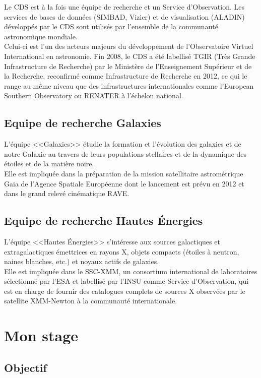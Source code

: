 \documentclass[a4paper,french,8pt]{article}
\begin{document}
		Le CDS est à la fois une équipe de recherche et un Service d’Observation.
		Les services de bases de données (SIMBAD, Vizier) et de visualisation (ALADIN) développés par le CDS
		sont utilisés par l’ensemble de la communauté astronomique mondiale. \\
		Celui-ci est l'un des acteurs majeurs du développement de l'Observatoire Virtuel International en astronomie.
		Fin 2008, le CDS a été labellisé TGIR (Très Grande Infrastructure de Recherche) par le Ministère de l'Enseignement Supérieur et de la Recherche, 
		reconfirmé comme Infrastructure de Recherche en 2012, ce qui le range au même niveau que des infrastructures internationales
		comme l’European Southern Observatory ou RENATER à l’échelon national.

	\subsection{Equipe de recherche Galaxies}
	
		L’équipe <<Galaxies>> étudie la formation et l’évolution des galaxies et de notre Galaxie 
		au travers de leurs populations stellaires et de la dynamique des étoiles et de la matière noire. \\
		Elle est impliquée dans la préparation de la mission satellitaire astrométrique Gaia de l’Agence Spatiale Européenne 
		dont le lancement est prévu en 2012 et dans le grand relevé cinématique RAVE. 
	
	\subsection{Equipe de recherche Hautes Énergies} 
	
		L’équipe <<Hautes Énergies>> s’intéresse aux sources galactiques et extragalactiques émettrices en rayons X,
		objets compacts (étoiles à neutron, naines blanches, etc.) et noyaux actifs de galaxies.\\
		Elle est impliquée dans le SSC-XMM, un consortium international de laboratoires sélectionné par l’ESA
		et labellisé par l’INSU comme Service d’Observation, qui est en charge de fournir des catalogues complets
		de sources X observées par le satellite XMM-Newton à la communauté internationale. 

\section{Mon stage}

	\subsection{Objectif}	
	
\end{document}
